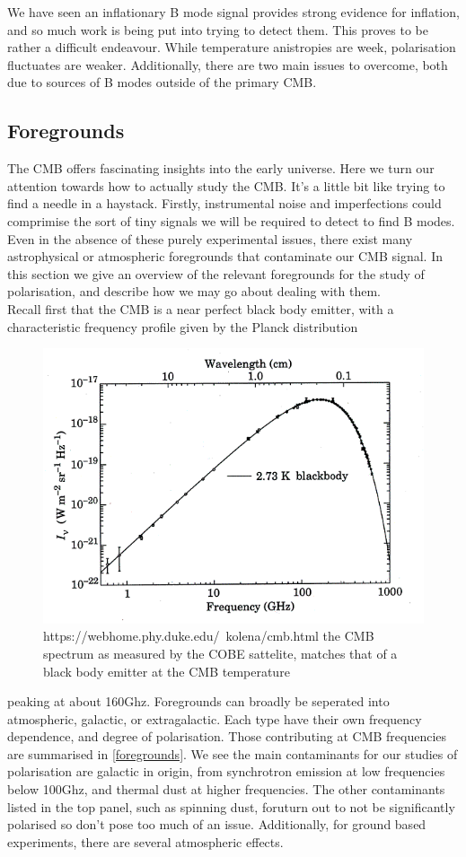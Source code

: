 \documentclass[a4paper,10pt]{article}
\begin{document}
We have seen an inflationary B mode signal provides strong evidence for inflation, and so much work is being put into trying to detect them. This proves to be rather a difficult endeavour. While temperature anistropies are week, polarisation fluctuates are weaker. Additionally, there are two main issues to overcome, both due to sources of B modes outside of the primary CMB.


\subsection{Foregrounds}

The CMB offers fascinating insights into the early universe. Here we turn our attention towards how to actually study the CMB. It's a little bit like trying to find a needle in a haystack. Firstly, instrumental noise and imperfections could comprimise the sort of tiny signals we will be required to detect to find B modes. Even in the absence of these purely experimental issues, there exist many astrophysical or atmospheric foregrounds that contaminate our CMB signal. In this section we give an overview of the relevant foregrounds for the study of polarisation, and describe how we may go about dealing with them.\\

Recall first that the CMB is a near perfect black body emitter, with a characteristic frequency profile given by the Planck distribution

\begin{figure}[h]
  \includegraphics[width=0.7\linewidth]{cmbspectrum1.png}
  \centering
  \caption{https://webhome.phy.duke.edu/~kolena/cmb.html the CMB spectrum as measured by the COBE sattelite, matches that of a black body emitter at the CMB temperature}
\end{figure}

peaking at about 160Ghz. Foregrounds can broadly be seperated into atmospheric, galactic, or extragalactic. Each type have their own frequency dependence, and degree of polarisation. Those contributing at CMB frequencies are summarised in \ref{foregrounds}. We see the main contaminants for our studies of polarisation are galactic in origin, from synchrotron emission at low frequencies below 100Ghz, and thermal dust at higher frequencies. The other contaminants listed in the top panel, such as spinning dust, foruturn out to not be significantly polarised so don't pose too much of an issue. Additionally, for ground based experiments, there are several atmospheric effects.
\end{document}
